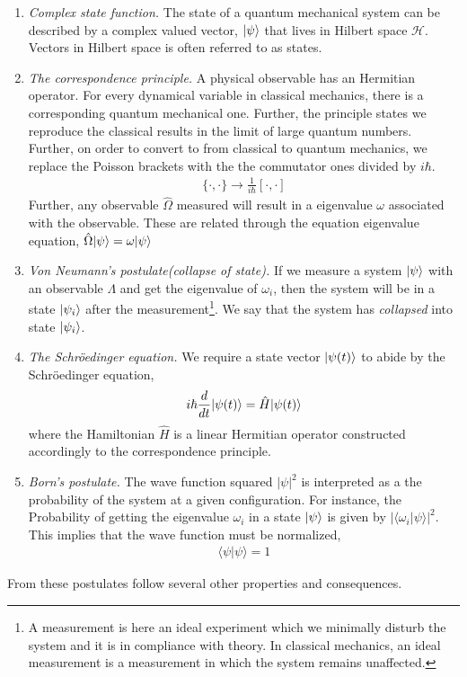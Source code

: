 \begin{enumerate}[I]
	\item \textit{Complex state function.} The state of a quantum mechanical system can be described by a complex valued vector, $|{\psi}\rangle$ that lives in Hilbert space $\mathcal{H}$. Vectors in Hilbert space is often referred to as states.
	\item \textit{The correspondence principle.} A physical observable has an Hermitian operator. For every dynamical variable in classical mechanics, there is a corresponding quantum mechanical one. Further, the principle states we reproduce the classical results in the limit of large quantum numbers. Further, on order to convert to from classical to quantum mechanics, we replace the Poisson brackets with the the commutator ones divided by $i\hbar$.
	\begin{align}
		\{\cdot,\cdot\} \rightarrow \frac{1}{i\hbar}[\cdot,\cdot]
		\label{eq:poisson}
	\end{align}
	Further, any observable $\hat{\Omega}$ measured will result in a eigenvalue $\omega$ associated with the observable. These are related through the equation eigenvalue equation, $\hat{\Omega}|{\psi}\rangle=\omega|{\psi}\rangle$
	\item \textit{Von Neumann's postulate(collapse of state).} If we measure a system $|{\psi}\rangle$ with an observable $\Lambda$ and get the eigenvalue of $\omega_i$, then the system will be in a state $|{\psi_i}\rangle$ after the measurement\footnote{A measurement is here an ideal experiment which we minimally disturb the system and it is in compliance with theory. In classical mechanics, an ideal measurement is a measurement in which the system remains unaffected.}. We say that the system has \textit{collapsed} into state $|{\psi_i}\rangle$.
	\item \textit{The Schröedinger equation.} We require a state vector $|{\psi(t)}\rangle$ to abide by the Schröedinger equation,
	\begin{align}
		i\hbar\frac{d}{dt}|{\psi(t)}\rangle = \hat{H} |{\psi(t)}\rangle
		\label{eq:schroedinger}
	\end{align}
	where the Hamiltonian $\hat{H}$ is a linear Hermitian operator constructed accordingly to the correspondence principle.
	\item \textit{Born's postulate.} The wave function squared $|\psi|^2$ is interpreted as a the probability of the system at a given configuration. For instance, the Probability of getting the eigenvalue $\omega_i$ in a state $|{\psi}\rangle$ is given by $|\langle\omega_i|\psi\rangle|^2$. This implies that the wave function must be normalized,
	\begin{align}
		\langle \psi | \psi \rangle = 1
		\label{eq:wf-normalized}
	\end{align}
\end{enumerate}
From these postulates follow several other properties and consequences.

